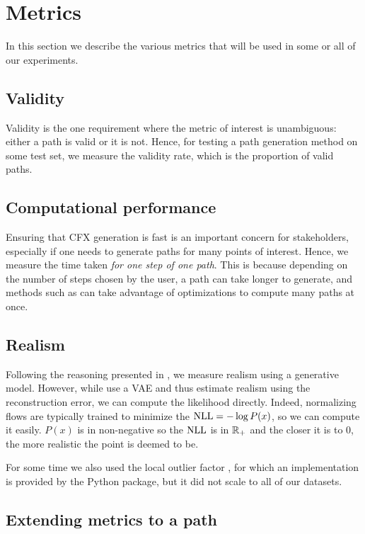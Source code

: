 \documentclass[../main.tex]{subfiles}
\begin{document}
\section{Metrics}

In this section we describe the various metrics that will be used in some or all of our experiments.

\subsection{Validity}

Validity is the one requirement where the metric of interest is unambiguous: either a path is valid or it is not.
Hence, for testing a path generation method on some test set, we measure the validity rate, which is the proportion of valid paths.

\subsection{Computational performance}

Ensuring that CFX generation is fast is an important concern for stakeholders, especially if one needs to generate paths for many points of interest.
Hence, we measure the time taken \emph{for one step of one path}.
This is because depending on the number of steps chosen by the user, a path can take longer to generate, and methods such as \ls{} can take advantage of optimizations to compute many paths at once.

\subsection{Realism}

Following the reasoning presented in \cite{vanlooverenInterpretable2021}, we measure realism using a generative model.
However, while \citeauthor{vanlooverenInterpretable2021} use a VAE and thus estimate realism using the reconstruction error, we can compute the likelihood directly.
Indeed, normalizing flows are typically trained to minimize the $\text{NLL} = - \log P(x)$, so we can compute it easily.
$P(x)$ is in non-negative so the $\text{NLL}$ is in $\mathbb{R}_+$ and the closer it is to 0, the more realistic the point is deemed to be.

For some time we also used the local outlier factor \cite{breunigLOF2000}, for which an implementation is provided by the \sklearn{} Python package, but it did not scale to all of our datasets.

\subsection{Extending metrics to a path}
\label{exp/masking}
\end{document}
